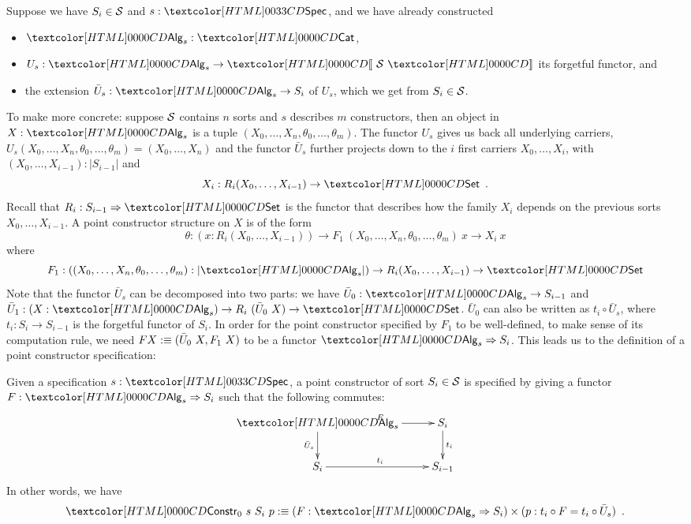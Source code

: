 Suppose we have $S_i \in \mathcal{S}$ and $s : \specty$, and we have already
constructed
%
\begin{itemize}
\item $\Alg_s : \Cat$,
\item $U_s : \Alg_s \to \SortCat{\Ss}$ its forgetful functor, and
\item the extension $\bar{U}_s : \Alg_s \to S_i$ of $U_s$, which we
  get from $S_i \in \mathcal{S}$.
\end{itemize}
%
To make more concrete: suppose $\mathcal{S}$ contains $n$ sorts and $s$
describes $m$ constructors, then an object in $X : \Alg_s$ is a tuple
$(X_0, \hdots, X_n, \theta_0, \hdots, \theta_m)$. The functor $U_s$
gives us back all underlying carriers, \ie
$U_s(X_0, \hdots, X_n, \theta_0, \hdots, \theta_m) = (X_0, \hdots,
X_n)$
and the functor $\bar{U}_s$ further projects down to the $i$ first
carriers $X_0, \hdots, X_i$, with
$(X_0, \hdots, X_{i-1}) : | S_{i-1} |$ and
\[
X_i : R_i (X_0, \hdots, X_{i-1}) \to \Set \enspace .
\]
Recall that $R_i : \Func{S_{i-1}}{\Set}$ is the functor that describes how
the family $X_i$ depends on the previous sorts $X_0, \hdots,
X_{i-1}$. A point constructor structure on $X$ is of the form
$$
\theta : (x : R_i (X_0, \hdots, X_{i-1})) \to F_1\ (X_0, \hdots, X_n, \theta_0, \hdots, \theta_m)\ x \to X_i\ x
$$
where
$$
F_1 : ((X_0,\hdots,X_n,\theta_0,\hdots,\theta_m) : | \Alg_s |) \to R_i (X_0, \hdots, X_{i-1}) \to \Set
$$
Note that the functor $\bar{U}_s$ can be decomposed into two parts: we
have $\bar{U}_0 : \Alg_s \to S_{i-1}$ and
$\bar{U}_1 : (X : \Alg_s) \to R_i\ (\bar{U}_0\ X) \to \Set$.
$\bar{U}_0$ can also be written as $t_i \circ \bar{U}_s$, where
$t_i : S_i \to S_{i-1}$ is the forgetful functor of $S_i$. In order
for the point constructor specified by $F_1$ to be well-defined, \ie
to make sense of its computation rule, we need
$F X :\equiv (\bar{U}_0\ X, F_1\ X)$ to be a functor
$\Func{\Alg_s}{S_i}$.  This leads us to the definition of a point
constructor specification:

\begin{definition}
  Given a specification $s : \specty$, a point constructor of sort
  $S_i \in \mathcal{S}$ is specified by giving a functor
  $F : \Func{\Alg_s}{S_i}$ such that the following commutes:
  $$
  \xymatrix{
    \Alg_s \ar[r]^{F} \ar[d]_{\bar{U}_s} &S_i \ar[d]^{t_i} \\
    S_i \ar[r]^{t_i} &S_{i-1}
  }
  $$
  In other words, we have
  $$
  \Constr_0\ s\ S_i\ p \ddefeq (F : \Func{\Alg_s}{S_i}) \times (p : t_i \circ F = t_i \circ \bar{U}_s) \enspace .
  $$
\end{definition} 

